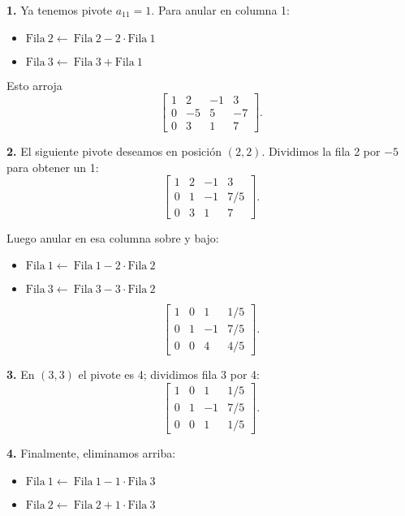 \noindent \textbf{1.} Ya tenemos pivote \(a_{11}=1\). Para anular en columna 1:
\begin{itemize}
  \item \(\text{Fila} ~ 2 \leftarrow ~ \text{Fila} ~ 2 - 2\cdot\text{Fila} ~ 1\)
  \item \(\text{Fila} ~ 3 \leftarrow ~ \text{Fila} ~ 3 + \text{Fila} ~ 1\)
\end{itemize}
Esto arroja
\[
\left[\begin{array}{ccc|c}
1 & 2 & -1 & 3\\
0 & -5 & 5 & -7\\
0 & 3 & 1 & 7
\end{array}\right].
\]

\noindent \textbf{2.} El siguiente pivote deseamos en posición \((2,2)\). Dividimos la fila 2 por \(-5\) para obtener un 1:
\[
\left[\begin{array}{ccc|c}
1 & 2 & -1 & 3\\
0 & 1 & -1 & 7/5\\
0 & 3 & 1 & 7
\end{array}\right].
\]

Luego anular en esa columna sobre y bajo:
\begin{itemize}
  \item \(\text{Fila} ~ 1 \leftarrow ~ \text{Fila} ~ 1 - 2\cdot\text{Fila} ~ 2\)
  \item \(\text{Fila} ~ 3 \leftarrow ~ \text{Fila} ~ 3 - 3\cdot\text{Fila} ~ 2\)
\end{itemize}

\[
\left[\begin{array}{ccc|c}
1 & 0 & 1 & 1/5\\
0 & 1 & -1 & 7/5\\
0 & 0 & 4 & 4/5
\end{array}\right].
\]

\noindent \textbf{3.} En \((3,3)\) el pivote es 4; dividimos fila 3 por 4:
\[
\left[\begin{array}{ccc|c}
1 & 0 & 1 & 1/5\\
0 & 1 & -1 & 7/5\\
0 & 0 & 1 & 1/5
\end{array}\right].
\]

\noindent \textbf{4.} Finalmente, eliminamos arriba:
\begin{itemize}
  \item \(\text{Fila} ~ 1 \leftarrow ~ \text{Fila} ~ 1 - 1\cdot\text{Fila} ~ 3\)
  \item \(\text{Fila} ~ 2 \leftarrow ~ \text{Fila} ~ 2 + 1\cdot\text{Fila} ~ 3\)
\end{itemize}

